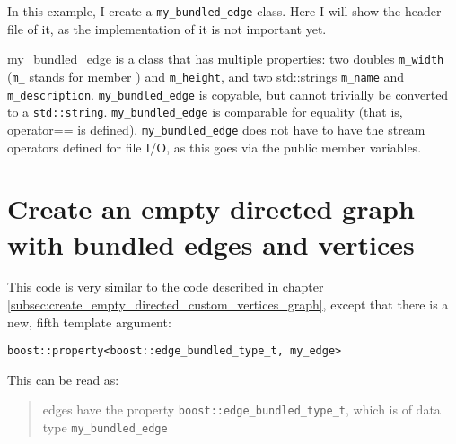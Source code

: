 In this example, I create a \verb;my_bundled_edge; class.
Here I will show the header file of it, as the implementation of it is
not important yet.



my\_bundled\_edge is a class that has multiple properties: 
two doubles \verb;m_width; 
(\verb;m_;  stands for member ) 
and \verb;m_height;, 
and two std::strings \verb;m_name; and \verb;m_description;.
\verb;my_bundled_edge; is copyable, 
but cannot trivially be converted to a \verb;std::string;. 
\verb;my_bundled_edge; is comparable for equality 
(that is, operator== is defined).
\verb;my_bundled_edge; does not have to have the stream operators defined for
file I/O, as this goes via the public member variables.

\section{Create an empty directed graph with bundled edges and vertices}
\label{subsec:create_empty_directed_bundled_edges_and_vertices_graph}



This code is very similar to the code described in chapter 
\ref{subsec:create_empty_directed_custom_vertices_graph}, 
except that there is a new, fifth template argument:

\begin{verbatim}
boost::property<boost::edge_bundled_type_t, my_edge>
\end{verbatim}

This can be read as: 
\begin{quote}
edges have the property \verb;boost::edge_bundled_type_t;, 
which is of data type \verb;my_bundled_edge;
\end{quote}

